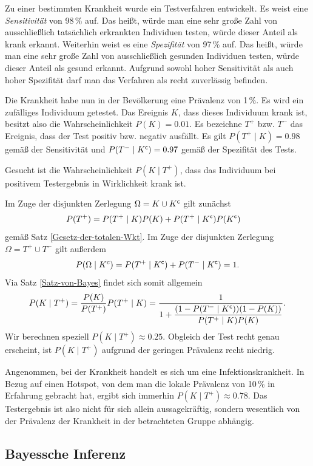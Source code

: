 \noindent
{}
Zu einer bestimmten Krankheit wurde ein Testverfahren entwickelt.
Es weist eine \emph{Sensitivität} von 98\,\% auf. Das heißt, würde man
eine sehr große Zahl von ausschließlich tatsächlich erkrankten
Individuen testen, würde dieser Anteil als krank erkannt.
Weiterhin weist es eine \emph{Spezifität} von 97\,\% auf. Das heißt, würde
man eine sehr große Zahl von ausschließlich gesunden Individuen testen,
würde dieser Anteil als gesund erkannt. Aufgrund sowohl hoher Sensitivität
als auch hoher Spezifität darf man das Verfahren als recht zuverlässig
befinden.

Die Krankheit habe nun in der Bevölkerung eine Prävalenz von
1\,\%. Es wird ein zufälliges Individuum getestet. Das Ereignis $K$, dass
dieses Individuum krank ist, besitzt also die Wahrscheinlichkeit
$P(K)=0.01$. Es bezeichne $T^+$ bzw. $T^-$ das Ereignis, dass der Test
positiv bzw. negativ ausfällt. Es gilt $P(T^+\mid K)=0.98$ gemäß
der Sensitivität und $P(T^-\mid K^\mathsf c)=0.97$ gemäß der Spezifität
des Tests.

Gesucht ist die Wahrscheinlichkeit $P(K\mid T^+)$, dass das Individuum
bei positivem Testergebnis in Wirklichkeit krank ist.

Im Zuge der disjunkten Zerlegung $\Omega = K\cup K^\mathsf c$ gilt zunächst
\begin{align*}
P(T^+) &= P(T^+\mid K)P(K) + P(T^+\mid K^\mathsf c)P(K^\mathsf c)
\end{align*}
gemäß Satz \ref{Gesetz-der-totalen-Wkt}. Im Zuge der disjunkten
Zerlegung $\Omega = T^+\cup T^-$ gilt außerdem
\[P(\Omega\mid K^c) = P(T^+\mid K^\mathsf c)+P(T^-\mid K^\mathsf c)=1.\]
Via Satz \ref{Satz-von-Bayes} findet sich somit allgemein
\[P(K\mid T^+) = \frac{P(K)}{P(T^+)}P(T^+\mid K) =
\dfrac{1}{1+\dfrac{(1-P(T^-\mid K^\mathsf c))(1-P(K))}{P(T^+\mid K)P(K)}}.\]
Wir berechnen speziell $P(K\mid T^+)\approx 0.25$. Obgleich der
Test recht genau erscheint, ist $P(K\mid T^+)$ aufgrund der
geringen Prävalenz recht niedrig.

Angenommen, bei der Krankheit handelt es sich um eine Infektionskrankheit.
In Bezug auf einen Hotspot, von dem man die lokale Prävalenz von
10\,\% in Erfahrung gebracht hat, ergibt sich immerhin $P(K\mid T^+)\approx 0.78$.
Das Testergebnis ist also nicht für sich allein aussagekräftig, sondern
wesentlich von der Prävalenz der Krankheit in der betrachteten Gruppe abhängig.

\subsection{Bayessche Inferenz}

